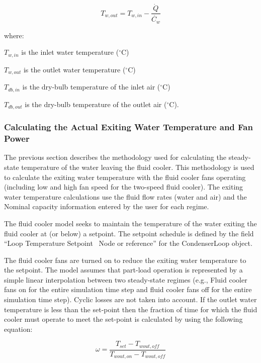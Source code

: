 \begin{equation}
{T_{w,out}} = {T_{w,in}} - \frac{\dot{Q}}{\dot{C_w}}
\end{equation}

where:

\({T_{w,in}}\) is the inlet water temperature (\(^{\circ}\)C)

\({T_{w,out}}\) is the outlet water temperature (\(^{\circ}\)C)

\({T_{db,in}}\) is the dry-bulb temperature of the inlet air (\(^{\circ}\)C)

\({T_{db,out}}\) is the dry-bulb temperature of the outlet air (\(^{\circ}\)C).

\subsubsection{Calculating the Actual Exiting Water Temperature and Fan Power}\label{calculating-the-actual-exiting-water-temperature-and-fan-power-1}

The previous section describes the methodology used for calculating the steady-state temperature of the water leaving the fluid cooler. This methodology is used to calculate the exiting water temperature with the fluid cooler fans operating (including low and high fan speed for the two-speed fluid cooler). The exiting water temperature calculations use the fluid flow rates (water and air) and the Nominal capacity information entered by the user for each regime.

The fluid cooler model seeks to maintain the temperature of the water exiting the fluid cooler at (or below) a setpoint. The setpoint schedule is defined by the field ``Loop Temperature Setpoint~ Node or reference'' for the CondenserLoop object.

The fluid cooler fans are turned on to reduce the exiting water temperature to the setpoint. The model assumes that part-load operation is represented by a simple linear interpolation between two steady-state regimes (e.g., Fluid cooler fans on for the entire simulation time step and fluid cooler fans off for the entire simulation time step). Cyclic losses are not taken into account. If the outlet water temperature is less than the set-point then the fraction of time for which the fluid cooler must operate to meet the set-point is calculated by using the following equation:

\begin{equation}
\omega = \frac{{{T_{set}} - {T_{wout,off}}}}{{{T_{wout,on}} - {T_{wout,off}}}}
\end{equation}

